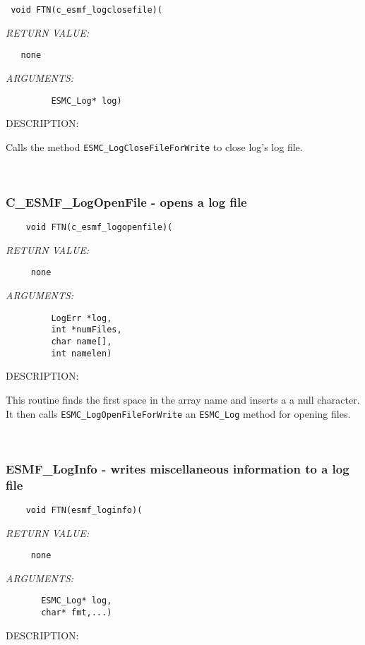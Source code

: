   
\begin{verbatim} 
 void FTN(c_esmf_logclosefile)(\end{verbatim}{\em RETURN VALUE:}
\begin{verbatim}   none\end{verbatim}{\em ARGUMENTS:}
\begin{verbatim}         ESMC_Log* log)\end{verbatim}
{\sf DESCRIPTION:\\ }


   Calls the method {\tt ESMC\_LogCloseFileForWrite} to close log's 
   log file.
   
 
\mbox{}\hrulefill\ 
 

  \subsubsection [C\_ESMF\_LogOpenFile] {C\_ESMF\_LogOpenFile - opens a log file}


\begin{verbatim}    void FTN(c_esmf_logopenfile)(\end{verbatim}{\em RETURN VALUE:}
\begin{verbatim}     none\end{verbatim}{\em ARGUMENTS:}
\begin{verbatim}         LogErr *log, 
         int *numFiles, 
         char name[], 
         int namelen)\end{verbatim}
{\sf DESCRIPTION:\\ }


   This routine finds the first space in the array name and inserts a
   a null character. It then calls {\tt ESMC\_LogOpenFileForWrite} 
   an {\tt ESMC\_Log} method for opening files. 
 
\mbox{}\hrulefill\ 
 
\subsubsection [ESMF\_LogInfo] {ESMF\_LogInfo - writes miscellaneous information to a log file}


  
\begin{verbatim}    void FTN(esmf_loginfo)(\end{verbatim}{\em RETURN VALUE:}
\begin{verbatim}     none\end{verbatim}{\em ARGUMENTS:}
\begin{verbatim}       ESMC_Log* log,
       char* fmt,...)\end{verbatim}
{\sf DESCRIPTION:\\ }


